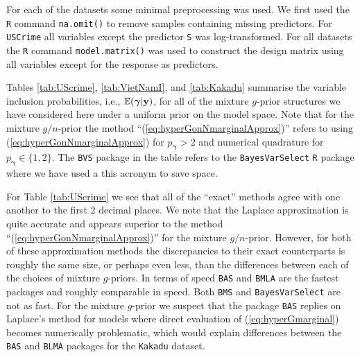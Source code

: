 \documentclass[12pt]{article}
\def\vectorfontone{\bf}
\def\vectorfonttwo{\boldsymbol}
\def\vy{{\vectorfontone y}}                      %
\def\vgamma{{\vectorfonttwo \gamma}}             %
\def\bE{{\mathbb E}}                             %
\begin{document}
For each of the datasets some minimal preprocessing was used.
We first used the {\tt R} command {\tt na.omit()} to remove samples containing missing predictors. 
For {\tt USCrime} all variables except the predictor {\tt S} was log-transformed. For all datasets
the {\tt R} command {\tt model.matrix()} was used to construct the design matrix using all 
variables except for the response as predictors.

Tables \ref{tab:UScrime}, \ref{tab:VietNamI}, and \ref{tab:Kakadu} summarise the variable 
inclusion probabilities, i.e., $\bE(\vgamma|\vy)$, for all of the mixture $g$-prior structures we have considered here under a uniform prior
on the model space. Note that for the mixture $g/n$-prior the method ``(\ref{eq:hyperGonNmarginalApprox})''
refers to using (\ref{eq:hyperGonNmarginalApprox}) for $p_\vgamma >2$ and numerical quadrature for $p_\vgamma \in \{ 1,2\}$. The {\tt BVS} package in the table refers to the {\tt BayesVarSelect} {\tt R} package where we have used a this acronym to save space. 

For Table \ref{tab:UScrime} we see that all of the ``exact'' methods agree with one another to the first 2 decimal 
places. We note that the Laplace approximation is quite accurate and appears superior to  the method
``(\ref{eq:hyperGonNmarginalApprox})'' for the mixture $g/n$-prior. However, for both of these approximation
methods the discrepancies to their exact counterparts is roughly the same size, or perhaps even less, than
the differences between each of the choices of mixture $g$-priors. In terms of speed {\tt BAS} and {\tt BMLA} are
the fastest packages and roughly comparable in speed. Both {\tt BMS} and {\tt BayesVarSelect} are not as fast.
For the mixture $g$-prior we suspect that the package {\tt BAS} replies on Laplace's method for models
where direct evaluation of (\ref{eq:hyperGmarginal}) becomes numerically problematic, which would explain
differences between the {\tt BAS} and {\tt BLMA} packages for the {\tt Kakadu} dataset.

 
\end{document}
